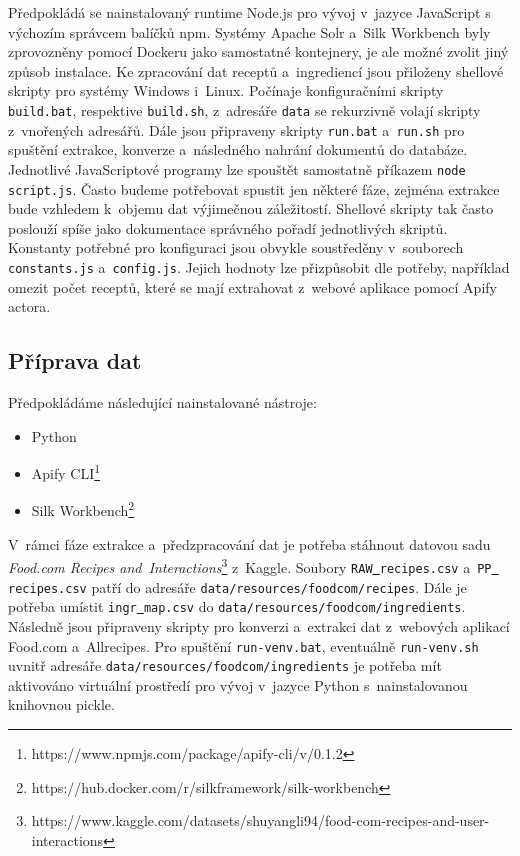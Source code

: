 \documentclass[12pt,a4paper]{report}
\begin{document}
Předpokládá se nainstalovaný runtime Node.js pro vývoj v~jazyce JavaScript s výchozím správcem balíčků npm. Systémy Apache Solr a~Silk Workbench byly zprovozněny pomocí Dockeru jako samostatné kontejnery, je ale možné zvolit jiný způsob instalace. Ke zpracování dat receptů a~ingrediencí jsou přiloženy shellové skripty pro systémy Windows i~Linux. Počínaje konfiguračními skripty \texttt{build.bat}, respektive \texttt{build.sh}, z~adresáře \texttt{data} se rekurzivně volají skripty z~vnořených adresářů. Dále jsou připraveny skripty \texttt{run.bat} a~\texttt{run.sh} pro spuštění extrakce, konverze a~následného nahrání dokumentů do databáze. Jednotlivé JavaScriptové programy lze spouštět samostatně příkazem \texttt{node\,script.js}. Často budeme potřebovat spustit jen některé fáze, zejména extrakce bude vzhledem k~objemu dat výjimečnou záležitostí. Shellové skripty tak často poslouží spíše jako dokumentace správného pořadí jednotlivých skriptů. Konstanty potřebné pro konfiguraci jsou obvykle soustředěny v~souborech \texttt{constants.js} a~\texttt{config.js}. Jejich hodnoty lze přizpůsobit dle potřeby, například omezit počet receptů, které se mají extrahovat z~webové aplikace pomocí Apify actora.

\subsection{Příprava dat}

Předpokládáme následující nainstalované nástroje:

\begin{itemize}
    \item Python
    \item Apify CLI\footnote{https://www.npmjs.com/package/apify-cli/v/0.1.2}
    \item Silk Workbench\footnote{https://hub.docker.com/r/silkframework/silk-workbench}
\end{itemize}

V~rámci fáze extrakce a~předzpracování dat je potřeba stáhnout datovou sadu \emph{Food.com Recipes and~Interactions}\footnote{https://www.kaggle.com/datasets/shuyangli94/food-com-recipes-and-user-interactions} z~Kaggle. Soubory \texttt{RAW\underline{{ }}recipes.csv} a~\texttt{PP\underline{{ }}recipes.csv} patří do adresáře \texttt{data/resources/foodcom/recipes}. Dále je potřeba umístit \texttt{ingr\underline{{ }}map.csv} do \texttt{data/resources/foodcom/ingredients}. Následně jsou připraveny skripty pro konverzi a~extrakci dat z~webových aplikací Food.com a~Allrecipes. Pro spuštění \texttt{run-venv.bat}, eventuálně \texttt{run-venv.sh} uvnitř adresáře \texttt{data/resources/foodcom/ingredients} je potřeba mít aktivováno virtuální prostředí pro vývoj v~jazyce Python s~nainstalovanou knihovnou pickle.
\end{document}
